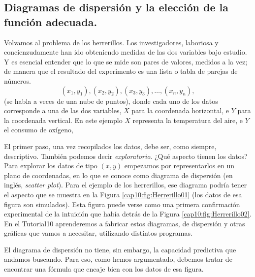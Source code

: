 \subsection{Diagramas de dispersión y la elección de la función adecuada.}
\label{cap10:subsec:DiagramasDIspersionEleccionFuncionAdecuada}

Volvamos al problema de los herrerillos. Los investigadores, laboriosa y concienzudamente han ido obteniendo medidas de  las dos variables bajo estudio. Y es esencial entender que lo que se mide son {\sf pares} de valores, medidos a la vez; de manera que el resultado del experimento es una lista o tabla de parejas de números.
\[(x_1,y_1),(x_2,y_2),(x_3,y_3),\ldots,(x_n,y_n),\]
(se habla a veces de una {\sf nube de puntos}), donde cada uno de los datos corresponde a una de las dos variables, $X$ para la coordenada
horizontal, e $Y$ para la coordenada vertical.  En este ejemplo $X$ representa la temperatura del
aire, e $Y$ el consumo de oxígeno,

El primer paso, una vez recopilados los datos, debe ser, como siempre, descriptivo. También podemos decir {\em exploratorio}. ¿Qué aspecto tienen los datos?  Para explorar los datos de tipo $(x,y)$ empezamos por representarlos en un plano de coordenadas, en lo que se conoce como {\sf diagrama de dispersión} (en inglés, {\em scatter plot}). Para el ejemplo de los herrerillos, ese diagrama podría tener el aspecto que se muestra en la Figura \ref{cap10:fig:Herrerillo01} (los datos de esa figura son simulados). Esta figura puede verse como una primera confirmación experimental de la intuición que había detrás de la Figura \ref{cap10:fig:Herrerillo02}. En el Tutorial10 aprenderemos a fabricar estos diagramas, de dispersión y otras gráficas que vamos a necesitar, utilizando distintos programas.

El diagrama de dispersión no tiene, sin embargo, la capacidad predictiva que andamos buscando. Para eso, como hemos argumentado, debemos tratar de encontrar una fórmula que encaje bien con los datos de esa figura.

